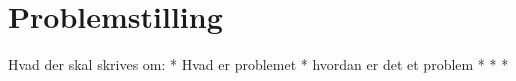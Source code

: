 \section{Problemstilling}
Hvad der skal skrives om:
* Hvad er problemet 
* hvordan er det et problem
* 
*
*
